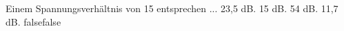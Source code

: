     {Einem Spannungsverhältnis von 15 entsprechen ...}
    {23,5 dB.}
    {15 dB.}
    {54 dB.}
    {11,7 dB.}
    {false}{false}